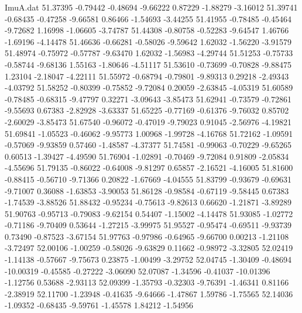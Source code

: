 \begin{filecontents}{ImuA.dat}
  51.37395   -0.79442   -0.48694   -9.66222    0.87229   -1.88279   -3.16012
  51.39741   -0.68435   -0.47258   -9.66581    0.86466   -1.54693   -3.44255
  51.41955   -0.78485   -0.45464   -9.72682    1.16998   -1.06605   -3.74787
  51.44308   -0.80758   -0.52283   -9.64547    1.46766   -1.69196   -4.14478
  51.46636   -0.66281   -0.58026   -9.59642    1.62032   -1.56220   -3.91579
  51.48974   -0.75972   -0.57787   -9.63470    1.62032   -1.56983   -4.29744
  51.51253   -0.75733   -0.58744   -9.68136    1.55163   -1.80646   -4.51117
  51.53610   -0.73699   -0.70828   -9.88475    1.23104   -2.18047   -4.22111
  51.55972   -0.68794   -0.79801   -9.89313    0.29218   -2.49343   -4.03792
  51.58252   -0.80399   -0.75852   -9.72084    0.20059   -2.63845   -4.05319
  51.60589   -0.78485   -0.68315   -9.47797    0.32271   -3.09643   -3.85473
  51.62941   -0.73579   -0.72861   -9.55693    0.67383   -2.82928   -3.63337
  51.65225   -0.77169   -0.61376   -9.76032    0.85702   -2.60029   -3.85473
  51.67540   -0.96072   -0.47019   -9.79023    0.91045   -2.56976   -4.19821
  51.69841   -1.05523   -0.46062   -9.95773    1.00968   -1.99728   -4.16768
  51.72162   -1.09591   -0.57069   -9.93859    0.57460   -1.48587   -4.37377
  51.74581   -0.99063   -0.70229   -9.65265    0.60513   -1.39427   -4.49590
  51.76904   -1.02891   -0.70469   -9.72084    0.91809   -2.05834   -4.55696
  51.79135   -0.86022   -0.64008   -9.81297    0.65857   -2.16521   -4.16005
  51.81600   -0.88415   -0.56710   -9.71366    0.20822   -1.67669   -4.04555
  51.83799   -0.93679   -0.69631   -9.71007    0.36088   -1.63853   -3.90053
  51.86128   -0.98584   -0.67119   -9.58445    0.67383   -1.74539   -3.88526
  51.88432   -0.95234   -0.75613   -9.82613    0.66620   -1.21871   -3.89289
  51.90763   -0.95713   -0.79083   -9.62154    0.54407   -1.15002   -4.14478
  51.93085   -1.02772   -0.71186   -9.70409    0.53644   -1.27215   -3.99975
  51.95527   -0.95474   -0.69511   -9.93739    0.73490   -0.87523   -3.67154
  51.97763   -0.97986   -0.64965   -9.66700    0.00213   -1.21108   -3.72497
  52.00106   -1.00259   -0.58026   -9.63829    0.11662   -0.98972   -3.32805
  52.02419   -1.14138   -0.57667   -9.75673    0.23875   -1.00499   -3.29752
  52.04745   -1.30409   -0.48694  -10.00319   -0.45585   -0.27222   -3.06090
  52.07087   -1.34596   -0.41037  -10.01396   -1.12756    0.53688   -2.93113
  52.09399   -1.35793   -0.32303   -9.76391   -1.46341    0.81166   -2.38919
  52.11700   -1.23948   -0.41635   -9.64666   -1.47867    1.59786   -1.75565
  52.14036   -1.09352   -0.68435   -9.59761   -1.45578    1.84212   -1.54956

\end{filecontents}
